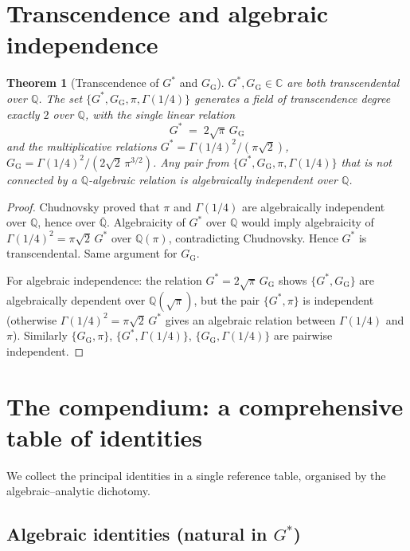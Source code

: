 \documentclass[11pt]{article}
\newtheorem{theorem}{Theorem}[section]
\theoremstyle{definition}
\theoremstyle{remark}
\newcommand{\Gs}{G^{*}}
\newcommand{\GG}{G_{\!\scriptscriptstyle\mathrm{G}}}
\newcommand{\Q}{\mathbb{Q}}
\newcommand{\C}{\mathbb{C}}
\begin{document}
\section{Transcendence and algebraic independence}\label{sec:transcendence}

\begin{theorem}[Transcendence of $\Gs$ and $\GG$]\label{thm:transcendence}
$\Gs, \GG \in \C$ are both transcendental over $\Q$. The set $\{\Gs, \GG, \pi, \Gamma(1/4)\}$
generates a field of transcendence degree exactly $2$ over $\Q$, with the
single linear relation
\[
\Gs \;=\; 2\sqrt\pi\,\GG
\]
and the multiplicative relations $\Gs = \Gamma(1/4)^2/(\pi\sqrt 2)$,
$\GG = \Gamma(1/4)^2/(2\sqrt 2\,\pi^{3/2})$. Any pair from
$\{\Gs, \GG, \pi, \Gamma(1/4)\}$ that is not connected by a $\Q$-algebraic relation
is algebraically independent over $\Q$.
\end{theorem}

\begin{proof}
Chudnovsky \cite{chudnovsky1976} proved that $\pi$ and $\Gamma(1/4)$ are
algebraically independent over $\Q$, hence over $\overline{\Q}$. Algebraicity
of $\Gs$ over $\Q$ would imply algebraicity of $\Gamma(1/4)^2 = \pi\sqrt 2\,\Gs$
over $\Q(\pi)$, contradicting Chudnovsky. Hence $\Gs$ is transcendental.
Same argument for $\GG$.

For algebraic independence: the relation $\Gs = 2\sqrt\pi\,\GG$ shows
$\{\Gs, \GG\}$ are algebraically dependent over $\Q(\sqrt\pi)$, but the pair
$\{\Gs, \pi\}$ is independent (otherwise $\Gamma(1/4)^2 = \pi\sqrt 2\,\Gs$
gives an algebraic relation between $\Gamma(1/4)$ and $\pi$). Similarly
$\{\GG, \pi\}$, $\{\Gs, \Gamma(1/4)\}$, $\{\GG, \Gamma(1/4)\}$ are pairwise
independent.
\end{proof}

\section{The compendium: a comprehensive table of identities}\label{sec:compendium}

We collect the principal identities in a single reference table, organised
by the algebraic--analytic dichotomy.

\subsection{Algebraic identities (natural in $\Gs$)}
\end{document}
